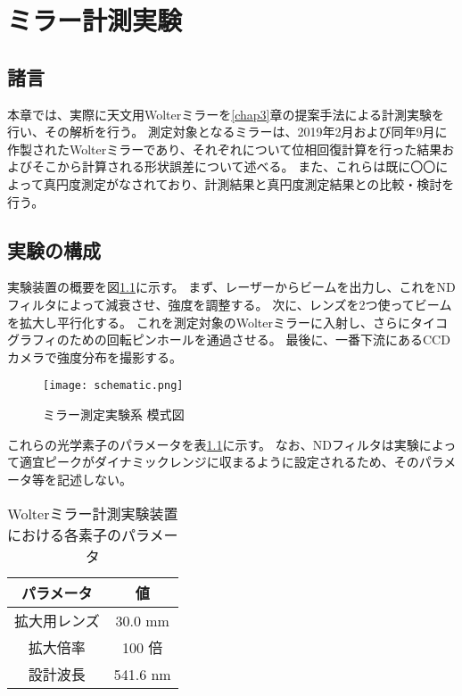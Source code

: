 \chapter{ミラー計測実験}
\thispagestyle{empty}
\label{chap5}
\graphicspath{{chap5/figure/}}
\minitoc

\newpage


\section{諸言}
\label{chap5_introduction}

本章では、実際に天文用Wolterミラーを\ref{chap3}章の提案手法による計測実験を行い、その解析を行う。
測定対象となるミラーは、2019年2月および同年9月に作製されたWolterミラーであり、それぞれについて位相回復計算を行った結果およびそこから計算される形状誤差について述べる。
また、これらは既に〇〇によって真円度測定がなされており、計測結果と真円度測定結果との比較・検討を行う。

\clearpage
\newpage

\section{実験の構成}

実験装置の概要を図\ref{fig:mirror_experiment_schematic}に示す。
まず、レーザーからビームを出力し、これをNDフィルタによって減衰させ、強度を調整する。
次に、レンズを2つ使ってビームを拡大し平行化する。
これを測定対象のWolterミラーに入射し、さらにタイコグラフィのための回転ピンホールを通過させる。
最後に、一番下流にあるCCDカメラで強度分布を撮影する。

\begin{figure}[!ht]
\centering
\texttt{[image: schematic.png]}
\caption{ミラー測定実験系 模式図}
\label{fig:mirror_experiment_schematic}
\end{figure}

これらの光学素子のパラメータを表\ref{tb:mirror_experiment_params}に示す。
なお、NDフィルタは実験によって適宜ピークがダイナミックレンジに収まるように設定されるため、そのパラメータ等を記述しない。

\begin{table}[h]
\begin{center}
  \begin{tabular}{|c|c|} \hline
    パラメータ & 値 \\ \hline
    拡大用レンズ & 30.0 mm  \\
    拡大倍率 & 100 倍 \\
    設計波長 & 541.6 nm \\ \hline
  \end{tabular}
  \caption{Wolterミラー計測実験装置における各素子のパラメータ}
  \label{tb:mirror_experiment_params}
\end{center}
\end{table}



